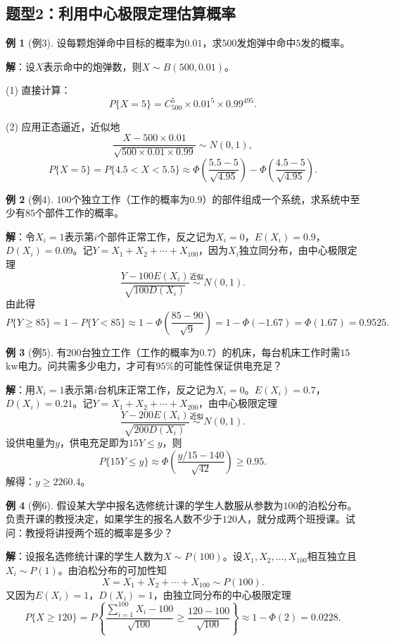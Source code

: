 \documentclass[11pt,a4paper]{report}
\theoremstyle{definition}
\newtheorem{example}{例}[chapter]
\theoremstyle{plain}
\begin{document}
\subsection{题型2：利用中心极限定理估算概率}

\begin{example}[例3]
设每颗炮弹命中目标的概率为$0.01$，求$500$发炮弹中命中$5$发的概率。

\textbf{解}：设$X$表示命中的炮弹数，则$X\sim B(500,0.01)$。

(1) 直接计算：
\[
P\{X=5\}=C_{500}^{5}\times 0.01^5\times 0.99^{495}.
\]

(2) 应用正态逼近，近似地
\[
\frac{X-500\times 0.01}{\sqrt{500\times 0.01\times 0.99}}\sim N(0,1),
\]
\[
P\{X=5\}=P\{4.5<X<5.5\}\approx\Phi\left(\frac{5.5-5}{\sqrt{4.95}}\right)-\Phi\left(\frac{4.5-5}{\sqrt{4.95}}\right).
\]
\end{example}

\begin{example}[例4]
$100$个独立工作（工作的概率为$0.9$）的部件组成一个系统，求系统中至少有$85$个部件工作的概率。

\textbf{解}：令$X_i=1$表示第$i$个部件正常工作，反之记为$X_i=0$，$E(X_i)=0.9$，$D(X_i)=0.09$。记$Y=X_1+X_2+\cdots+X_{100}$，因为$X_i$独立同分布，由中心极限定理
\[
\frac{Y-100E(X_i)}{\sqrt{100D(X_i)}}\stackrel{\text{近似}}{\sim}N(0,1).
\]
由此得
\[
P\{Y\geq 85\}=1-P\{Y<85\}\approx 1-\Phi\left(\frac{85-90}{\sqrt{9}}\right)=1-\Phi(-1.67)=\Phi(1.67)=0.9525.
\]
\end{example}

\begin{example}[例5]
有$200$台独立工作（工作的概率为$0.7$）的机床，每台机床工作时需$15$kw电力。问共需多少电力，才可有$95\%$的可能性保证供电充足？

\textbf{解}：用$X_i=1$表示第$i$台机床正常工作，反之记为$X_i=0$。$E(X_i)=0.7$，$D(X_i)=0.21$。记$Y=X_1+X_2+\cdots+X_{200}$，由中心极限定理
\[
\frac{Y-200E(X_i)}{\sqrt{200D(X_i)}}\stackrel{\text{近似}}{\sim}N(0,1).
\]
设供电量为$y$，供电充足即为$15Y\leq y$，则
\[
P\{15Y\leq y\}\approx\Phi\left(\frac{y/15-140}{\sqrt{42}}\right)\geq 0.95.
\]
解得：$y\geq 2260.4$。
\end{example}

\begin{example}[例6]
假设某大学中报名选修统计课的学生人数服从参数为$100$的泊松分布。负责开课的教授决定，如果学生的报名人数不少于$120$人，就分成两个班授课。试问：教授将讲授两个班的概率是多少？

\textbf{解}：设报名选修统计课的学生人数为$X\sim P(100)$。设$X_1,X_2,\ldots,X_{100}$相互独立且$X_i\sim P(1)$。由泊松分布的可加性知
\[
X=X_1+X_2+\cdots+X_{100}\sim P(100).
\]
又因为$E(X_i)=1$，$D(X_i)=1$，由独立同分布的中心极限定理
\[
P\{X\geq 120\}=P\left\{\frac{\sum_{i=1}^{100}X_i-100}{\sqrt{100}}\geq\frac{120-100}{\sqrt{100}}\right\}\approx 1-\Phi(2)=0.0228.
\]
\end{example}
\end{document}
